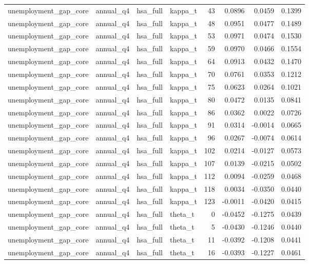 \begin{tabular}{llllrrrr}
unemployment\_gap\_core & annual\_q4 & hsa\_full & kappa\_t & 43 & 0.0896 & 0.0459 & 0.1399 \\
unemployment\_gap\_core & annual\_q4 & hsa\_full & kappa\_t & 48 & 0.0951 & 0.0477 & 0.1489 \\
unemployment\_gap\_core & annual\_q4 & hsa\_full & kappa\_t & 53 & 0.0971 & 0.0474 & 0.1530 \\
unemployment\_gap\_core & annual\_q4 & hsa\_full & kappa\_t & 59 & 0.0970 & 0.0466 & 0.1554 \\
unemployment\_gap\_core & annual\_q4 & hsa\_full & kappa\_t & 64 & 0.0913 & 0.0432 & 0.1470 \\
unemployment\_gap\_core & annual\_q4 & hsa\_full & kappa\_t & 70 & 0.0761 & 0.0353 & 0.1212 \\
unemployment\_gap\_core & annual\_q4 & hsa\_full & kappa\_t & 75 & 0.0623 & 0.0264 & 0.1021 \\
unemployment\_gap\_core & annual\_q4 & hsa\_full & kappa\_t & 80 & 0.0472 & 0.0135 & 0.0841 \\
unemployment\_gap\_core & annual\_q4 & hsa\_full & kappa\_t & 86 & 0.0362 & 0.0022 & 0.0726 \\
unemployment\_gap\_core & annual\_q4 & hsa\_full & kappa\_t & 91 & 0.0314 & -0.0014 & 0.0665 \\
unemployment\_gap\_core & annual\_q4 & hsa\_full & kappa\_t & 96 & 0.0267 & -0.0074 & 0.0614 \\
unemployment\_gap\_core & annual\_q4 & hsa\_full & kappa\_t & 102 & 0.0214 & -0.0127 & 0.0573 \\
unemployment\_gap\_core & annual\_q4 & hsa\_full & kappa\_t & 107 & 0.0139 & -0.0215 & 0.0502 \\
unemployment\_gap\_core & annual\_q4 & hsa\_full & kappa\_t & 112 & 0.0094 & -0.0259 & 0.0468 \\
unemployment\_gap\_core & annual\_q4 & hsa\_full & kappa\_t & 118 & 0.0034 & -0.0350 & 0.0440 \\
unemployment\_gap\_core & annual\_q4 & hsa\_full & kappa\_t & 123 & -0.0011 & -0.0420 & 0.0415 \\
unemployment\_gap\_core & annual\_q4 & hsa\_full & theta\_t & 0 & -0.0452 & -0.1275 & 0.0439 \\
unemployment\_gap\_core & annual\_q4 & hsa\_full & theta\_t & 5 & -0.0430 & -0.1246 & 0.0440 \\
unemployment\_gap\_core & annual\_q4 & hsa\_full & theta\_t & 11 & -0.0392 & -0.1208 & 0.0441 \\
unemployment\_gap\_core & annual\_q4 & hsa\_full & theta\_t & 16 & -0.0393 & -0.1227 & 0.0461 \\

\end{tabular}
